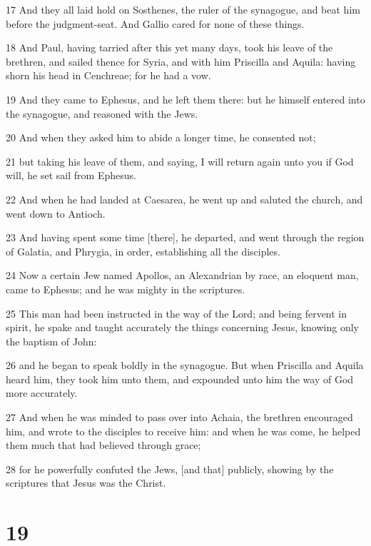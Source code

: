 \par 17 And they all laid hold on Sosthenes, the ruler of the synagogue, and beat him before the judgment-seat. And Gallio cared for none of these things.
\par 18 And Paul, having tarried after this yet many days, took his leave of the brethren, and sailed thence for Syria, and with him Priscilla and Aquila: having shorn his head in Cenchreae; for he had a vow.
\par 19 And they came to Ephesus, and he left them there: but he himself entered into the synagogue, and reasoned with the Jews.
\par 20 And when they asked him to abide a longer time, he consented not;
\par 21 but taking his leave of them, and saying, I will return again unto you if God will, he set sail from Ephesus.
\par 22 And when he had landed at Caesarea, he went up and saluted the church, and went down to Antioch.
\par 23 And having spent some time [there], he departed, and went through the region of Galatia, and Phrygia, in order, establishing all the disciples.
\par 24 Now a certain Jew named Apollos, an Alexandrian by race, an eloquent man, came to Ephesus; and he was mighty in the scriptures.
\par 25 This man had been instructed in the way of the Lord; and being fervent in spirit, he spake and taught accurately the things concerning Jesus, knowing only the baptism of John:
\par 26 and he began to speak boldly in the synagogue. But when Priscilla and Aquila heard him, they took him unto them, and expounded unto him the way of God more accurately.
\par 27 And when he was minded to pass over into Achaia, the brethren encouraged him, and wrote to the disciples to receive him: and when he was come, he helped them much that had believed through grace;
\par 28 for he powerfully confuted the Jews, [and that] publicly, showing by the scriptures that Jesus was the Christ.

\chapter{19}

